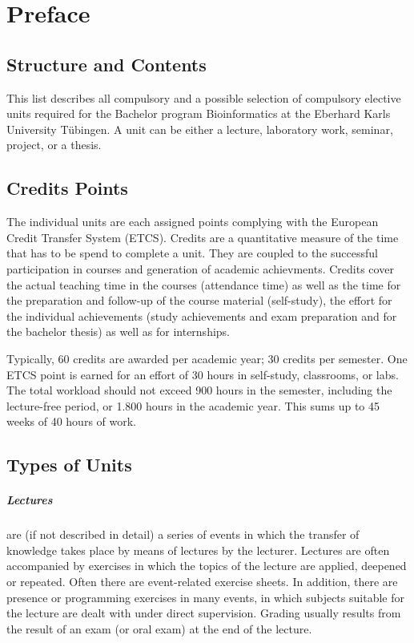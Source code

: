 \chapter*{Preface}

\section*{Structure and Contents}

This list describes all compulsory and a possible selection of compulsory elective units required for the Bachelor program Bioinformatics at the Eberhard Karls University Tübingen.
A unit can be either a lecture, laboratory work, seminar, project, or a thesis.

\section*{Credits Points}

The individual units are each assigned points complying with the European Credit Transfer System (ETCS). Credits are a quantitative measure of the time that has to be spend to complete a unit. 
They are coupled to the successful participation in courses and generation of academic achievments.
Credits cover the actual teaching time in the courses (attendance time) as well as the time for the preparation and follow-up of the course material (self-study), the effort for the individual achievements (study achievements and exam preparation and for the bachelor thesis) as well as for internships.
 
Typically, 60 credits are awarded per academic year; 30 credits per semester. 
One ETCS point is earned for an effort of 30 hours in self-study, classrooms, or labs.
The total workload should not exceed 900 hours in the semester, including the lecture-free period, or 1.800 hours in the academic year.
This sums up to 45 weeks of 40 hours of work.

\section*{Types of Units}

\paragraph{Lectures} are (if not described in detail) a series of events in which the transfer of knowledge takes place by means of lectures by the lecturer. Lectures are often accompanied by exercises in which the topics of the lecture are applied, deepened or repeated. Often there are event-related exercise sheets. In addition, there are presence or programming exercises in many events, in which subjects suitable for the lecture are dealt with under direct supervision. Grading usually results from the result of an exam (or oral exam) at the end of the lecture.

